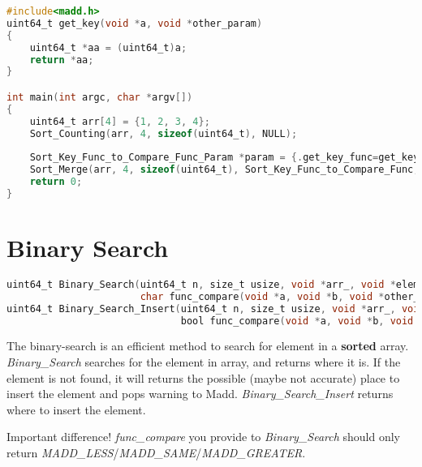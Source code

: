\begin{lstlisting}[language=C, title={Example of get-key function to compare function.},]
#include<madd.h>
uint64_t get_key(void *a, void *other_param)
{
    uint64_t *aa = (uint64_t)a;
    return *aa;
}

int main(int argc, char *argv[])
{
    uint64_t arr[4] = {1, 2, 3, 4};
    Sort_Counting(arr, 4, sizeof(uint64_t), NULL);
    
    Sort_Key_Func_to_Compare_Func_Param *param = {.get_key_func=get_key, .other_param=NULL};
    Sort_Merge(arr, 4, sizeof(uint64_t), Sort_Key_Func_to_Compare_Func, param);
    return 0;
}
\end{lstlisting}

\section{Binary Search}

\begin{lstlisting}[language=C, title={Binary search functions.},]
uint64_t Binary_Search(uint64_t n, size_t usize, void *arr_, void *element,
                       char func_compare(void *a, void *b, void *other_param), void *other_param);
uint64_t Binary_Search_Insert(uint64_t n, size_t usize, void *arr_, void *element,
                              bool func_compare(void *a, void *b, void *other_param), void *other_param);
\end{lstlisting}

The binary-search is an efficient method to search for element in a \textbf{sorted} array.
{\it Binary\_Search} searches for the element in array, and returns where it is.
If the element is not found, it will returns the possible (maybe not accurate) place to insert the element and pops warning to Madd.
{\it Binary\_Search\_Insert} returns where to insert the element.

Important difference! {\it func\_compare} you provide to {\it Binary\_Search} should only return {\it MADD\_LESS}/{\it MADD\_SAME}/{\it MADD\_GREATER}.